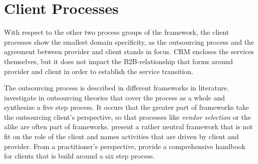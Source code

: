 	
	
	
	
	\newpage
	
	
	

	\section{Client Processes}
	
	With respect to the other two process groups of the framework, the client  processes show the smallest domain specificity, as the outsourcing process and the agreement between provider and client stands in focus. \acrshort{CRM} encloses the services themselves, but it does not impact the B2B-relationship that forms around provider and client in order to establish the service transition. 
	
	The outsourcing process is described in different frameworks in literature. \cite{perunovic2007outsourcing} investigate in outsourcing theories that cover the process as a whole and synthesize a five step process. It occurs that the greater part of frameworks take the outsourcing client's perspective, so that processes like \textit{vendor selection} or the alike are often part of frameworks. \cite{Agarwal_2008} present a rather neutral framework that is not fit on the role of the client and names activities that are driven by client and provider. From a practitioner's perspective, \cite{deloittehandbook} provide a comprehensive handbook for clients that is build around a six step process. 
	
